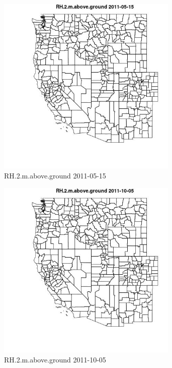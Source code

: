 \begin{figure} 
\centering  
\includegraphics[width=0.77\textwidth]{Code_Outputs/ML_input_report_ML_input_PM25_Step5_part_d_de_duplicated_aves_ML_input_MapObsRH2maboveground2011-05-15.jpg} 
\caption{\label{fig:ML_input_report_ML_input_PM25_Step5_part_d_de_duplicated_aves_ML_inputMapObsRH2maboveground2011-05-15}RH.2.m.above.ground 2011-05-15} 
\end{figure} 
 

\begin{figure} 
\centering  
\includegraphics[width=0.77\textwidth]{Code_Outputs/ML_input_report_ML_input_PM25_Step5_part_d_de_duplicated_aves_ML_input_MapObsRH2maboveground2011-10-05.jpg} 
\caption{\label{fig:ML_input_report_ML_input_PM25_Step5_part_d_de_duplicated_aves_ML_inputMapObsRH2maboveground2011-10-05}RH.2.m.above.ground 2011-10-05} 
\end{figure} 
 


